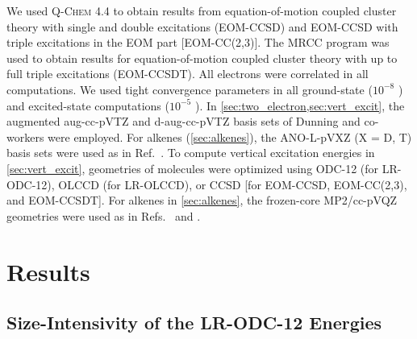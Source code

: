We used \textsc{Q-Chem} 4.4\cite{QChem} to obtain results from
equation-of-motion coupled cluster theory with single and double excitations
(EOM-CCSD) and EOM-CCSD with triple excitations in the EOM part [EOM-CC(2,3)].
The \textsc{MRCC} program\cite{MRCC} was used to obtain results for
equation-of-motion coupled cluster theory with up to full triple excitations
(EOM-CCSDT).
All electrons were correlated in all computations.
We used tight convergence parameters in all ground-state ($10^{-8}$ \hartree)
and excited-state computations ($10^{-5}$ \hartree).
In \cref{sec:two_electron,sec:vert_excit}, the augmented aug-cc-pVTZ and
d-aug-cc-pVTZ basis sets of Dunning and co-workers were
employed.\cite{Kendall:1992p6796}
For alkenes (\cref{sec:alkenes}), the ANO-L-pVXZ (X = D, T) basis
sets\cite{Widmark:1990p291} were used as in Ref.~.
To compute vertical excitation energies in \cref{sec:vert_excit}, geometries of
molecules were optimized using ODC-12 (for LR-ODC-12), OLCCD (for LR-OLCCD), or
CCSD [for EOM-CCSD, EOM-CC(2,3), and EOM-CCSDT].
For alkenes in \cref{sec:alkenes}, the frozen-core MP2/cc-pVQZ geometries were
used as in Refs.~ and .


\section{Results}
\label{sec:results}

\subsection{Size-Intensivity of the LR-ODC-12 Energies}
\label{sec:size_intensivity}

